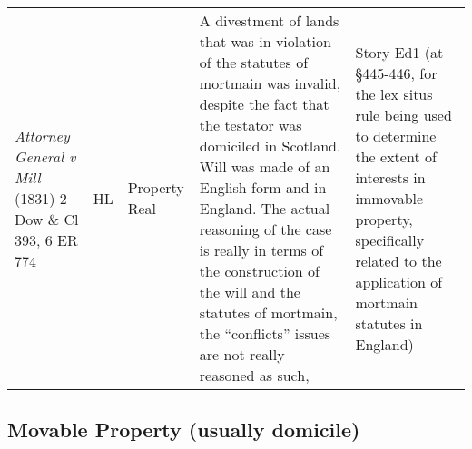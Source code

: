 \documentclass[twoside]{article}
\begin{document}
\begin{longtable}{p{4cm} p{1.7cm} p{2.5cm} p{5cm} p{2.5cm}}
\textit{Attorney General v Mill} (1831) 2 Dow \& Cl 393, 6 ER 774 & \small{HL} & \small{Property Real} & \small{A divestment of lands that was in violation of the statutes of mortmain was invalid, despite the fact that the testator was domiciled in Scotland. Will was made of an English form and in England. The actual reasoning of the case is really in terms of the construction of the will and the statutes of mortmain, the “conflicts” issues are not really reasoned as such,} & \small{Story Ed1 (at §445-446, for the lex situs rule being used to determine the extent of interests in immovable property, specifically related to the application of mortmain statutes in England)}\\ 
\end{longtable}\subsection{Movable Property (usually domicile)}
\end{document}

